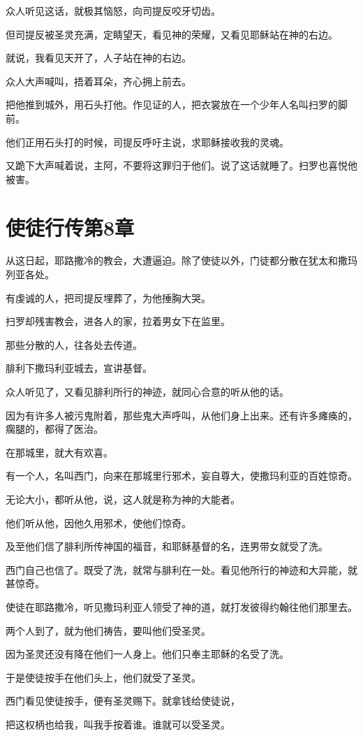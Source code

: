 \documentclass[12pt,oneside]{book}
\begin{document}
众人听见这话，就极其恼怒，向司提反咬牙切齿。

但司提反被圣灵充满，定睛望天，看见神的荣耀，又看见耶稣站在神的右边。

就说，我看见天开了，人子站在神的右边。

众人大声喊叫，捂着耳朵，齐心拥上前去。

把他推到城外，用石头打他。作见证的人，把衣裳放在一个少年人名叫扫罗的脚前。

他们正用石头打的时候，司提反呼吁主说，求耶稣接收我的灵魂。

又跪下大声喊着说，主阿，不要将这罪归于他们。说了这话就睡了。扫罗也喜悦他被害。

\chapter{使徒行传第8章}
从这日起，耶路撒冷的教会，大遭逼迫。除了使徒以外，门徒都分散在犹太和撒玛列亚各处。

有虔诚的人，把司提反埋葬了，为他捶胸大哭。

扫罗却残害教会，进各人的家，拉着男女下在监里。

那些分散的人，往各处去传道。

腓利下撒玛利亚城去，宣讲基督。

众人听见了，又看见腓利所行的神迹，就同心合意的听从他的话。

因为有许多人被污鬼附着，那些鬼大声呼叫，从他们身上出来。还有许多瘫痪的，瘸腿的，都得了医治。

在那城里，就大有欢喜。

有一个人，名叫西门，向来在那城里行邪术，妄自尊大，使撒玛利亚的百姓惊奇。

无论大小，都听从他，说，这人就是称为神的大能者。

他们听从他，因他久用邪术，使他们惊奇。

及至他们信了腓利所传神国的福音，和耶稣基督的名，连男带女就受了洗。

西门自己也信了。既受了洗，就常与腓利在一处。看见他所行的神迹和大异能，就甚惊奇。

使徒在耶路撒冷，听见撒玛利亚人领受了神的道，就打发彼得约翰往他们那里去。

两个人到了，就为他们祷告，要叫他们受圣灵。

因为圣灵还没有降在他们一人身上。他们只奉主耶稣的名受了洗。

于是使徒按手在他们头上，他们就受了圣灵。

西门看见使徒按手，便有圣灵赐下。就拿钱给使徒说，

把这权柄也给我，叫我手按着谁。谁就可以受圣灵。
\end{document}
